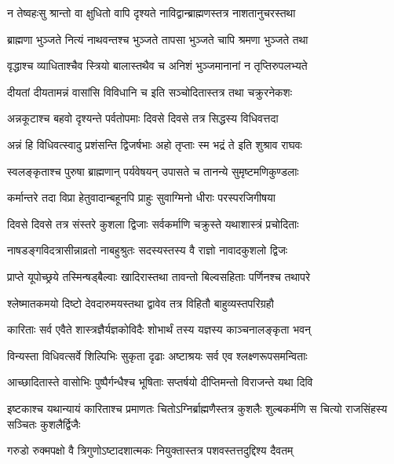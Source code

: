 \twolineshloka
{न तेष्वहःसु श्रान्तो वा क्षुधितो वापि दृश्यते}
{नाविद्वान्ब्राह्मणस्तत्र नाशतानुचरस्तथा} %

\twolineshloka
{ब्राह्मणा भुञ्जते नित्यं नाथवन्तश्च भुञ्जते}
{तापसा भुञ्जते चापि श्रमणा भुञ्जते तथा} %

\twolineshloka
{वृद्धाश्च व्याधिताश्चैव स्त्रियो बालास्तथैव च}
{अनिशं भुञ्जमानानां न तृप्तिरुपलभ्यते} %

\twolineshloka
{दीयतां दीयतामन्नं वासांसि विविधानि च}
{इति सञ्चोदितास्तत्र तथा चक्रुरनेकशः} %

\twolineshloka
{अन्नकूटाश्च बहवो दृश्यन्ते पर्वतोपमाः}
{दिवसे दिवसे तत्र सिद्धस्य विधिवत्तदा} %

\twolineshloka
{अन्नं हि विधिवत्स्वादु प्रशंसन्ति द्विजर्षभाः}
{अहो तृप्ताः स्म भद्रं ते इति शुश्राव राघवः} %

\twolineshloka
{स्वलङ्कृताश्च पुरुषा ब्राह्मणान् पर्यवेषयन्}
{उपासते च तानन्ये सुमृष्टमणिकुण्डलाः} %

\twolineshloka
{कर्मान्तरे तदा विप्रा हेतुवादान्बहूनपि}
{प्राहुः सुवाग्मिनो धीराः परस्परजिगीषया} %

\twolineshloka
{दिवसे दिवसे तत्र संस्तरे कुशला द्विजाः}
{सर्वकर्माणि चक्रुस्ते यथाशास्त्रं प्रचोदिताः} %

\twolineshloka
{नाषडङ्गविदत्रासीन्नाव्रतो नाबहुश्रुतः}
{सदस्यस्तस्य वै राज्ञो नावादकुशलो द्विजः} %

\twolineshloka
{प्राप्ते यूपोच्छ्रये तस्मिन्षड्बैल्वाः खादिरास्तथा}
{तावन्तो बिल्वसहिताः पर्णिनश्च तथापरे} %

\twolineshloka
{श्लेष्मातकमयो दिष्टो देवदारुमयस्तथा}
{द्वावेव तत्र विहितौ बाहुव्यस्तपरिग्रहौ} %

\twolineshloka
{कारिताः सर्व एवैते शास्त्रज्ञैर्यज्ञकोविदैः}
{शोभार्थं तस्य यज्ञस्य काञ्चनालङ्कृता भवन्} %

\twolineshloka
{विन्यस्ता विधिवत्सर्वे शिल्पिभिः सुकृता दृढाः}
{अष्टाश्रयः सर्व एव श्लक्ष्णरूपसमन्विताः} %

\twolineshloka
{आच्छादितास्ते वासोभिः पुष्पैर्गन्धैश्च भूषिताः}
{सप्तर्षयो दीप्तिमन्तो विराजन्ते यथा दिवि} %

\threelineshloka
{इष्टकाश्च यथान्यायं कारिताश्च प्रमाणतः}
{चितोऽग्निर्ब्राह्मणैस्तत्र कुशलैः शुल्बकर्मणि}
{स चित्यो राजसिंहस्य सञ्चितः कुशलैर्द्विजैः} %

\twolineshloka
{गरुडो रुक्मपक्षो वै त्रिगुणोऽष्टादशात्मकः}
{नियुक्तास्तत्र पशवस्तत्तदुद्दिश्य दैवतम्} %

